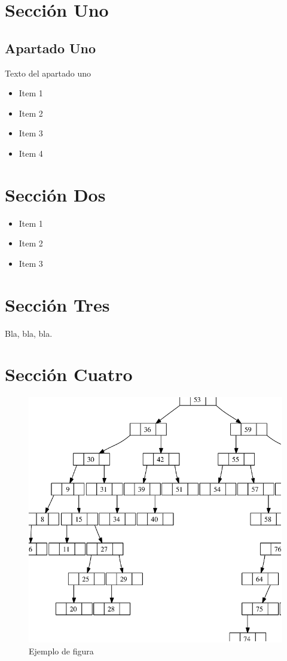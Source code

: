 \section{Sección Uno}
\subsection{Apartado Uno}
\begin{large}
Texto del apartado uno

\begin{itemize}
   \item Item 1
   \item Item 2
   \item Item 3
   \item Item 4
\end{itemize}
\end{large}

\section{Sección Dos}

\begin{large}
\begin{itemize}
   \item Item 1
   \item Item 2
   \item Item 3
\end{itemize}
\end{large}

\section{Sección Tres}

\begin{large}
Bla, bla, bla.
\end{large}

\section{Sección Cuatro}

\begin{large}

   

\end{large}

\newpage


\begin{figure}[htb]
   \centering
   \includegraphics[width=0.8\linewidth]{figures/figura_1}
   \caption{Ejemplo de figura}
   \label{chapter:introduction}
\end{figure}